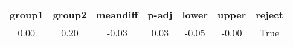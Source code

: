 \begin{tabular}{|c|c|c|c|c|c|c|}
\toprule
 group1 &  group2 &  meandiff &  p-adj &  lower &  upper &  reject \\
\midrule
   0.00 &    0.20 &     -0.03 &   0.03 &  -0.05 &  -0.00 &    True \\
\bottomrule
\end{tabular}
